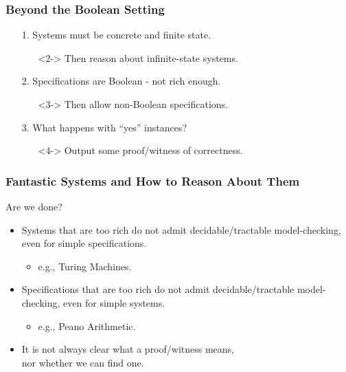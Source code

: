 \begin{frame}
\frametitle{Beyond the Boolean Setting}
\hspace*{2.8cm}
\begin{itemize}
\item[1. \xmark] Systems must be concrete and finite state.
\begin{itemize}
\item[\cmark]<2-> Then reason about infinite-state systems.
\end{itemize}
\item[2. \xmark] Specifications are Boolean - not rich enough.
\begin{itemize}
\item[\cmark]<3-> Then allow non-Boolean specifications.
\end{itemize}
\item[3. \xmark] What happens with ``yes'' instances?
\begin{itemize}
\item[\cmark]<4-> Output some proof/witness of correctness.
\end{itemize}
\end{itemize}
\end{frame}

\begin{frame}
 \frametitle{Fantastic Systems {\normalsize and How to Reason About Them}}
Are we done?
\onslide<+->
{\footnotesize
\begin{itemize}[<+->]
\item Systems that are too rich do not admit decidable/tractable model-checking, even for simple specifications.
\begin{itemize}
	\item e.g., Turing Machines.
\end{itemize}
\item Specifications that are too rich do not admit decidable/tractable model-checking, even for simple systems.
\begin{itemize}
	\item e.g., Peano Arithmetic.
\end{itemize}
\item It is not always clear what a proof/witness means, \\nor whether we can find one. 
\end{itemize}
}
\end{frame}

